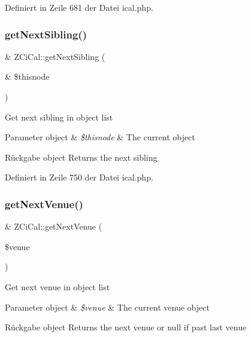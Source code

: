 Definiert in Zeile 681 der Datei ical.\+php.

\mbox{\label{class_z_ci_cal_a58f91909ccb0ce0cd0252427945b0049}} 
\subsubsection{\texorpdfstring{get\+Next\+Sibling()}{getNextSibling()}}
{\footnotesize\ttfamily \& Z\+Ci\+Cal\+::get\+Next\+Sibling (\begin{DoxyParamCaption}\item[{\&}]{\$thisnode }\end{DoxyParamCaption})}

Get next sibling in object list


\begin{DoxyParams}[1]{Parameter}
object & {\em \$thisnode} & The current object\\
\hline
\end{DoxyParams}
\begin{DoxyReturn}{Rückgabe}
object Returns the next sibling 
\end{DoxyReturn}


Definiert in Zeile 750 der Datei ical.\+php.

\mbox{\label{class_z_ci_cal_a39f53526421aa7122720bd5fae17b886}} 
\subsubsection{\texorpdfstring{get\+Next\+Venue()}{getNextVenue()}}
{\footnotesize\ttfamily \& Z\+Ci\+Cal\+::get\+Next\+Venue (\begin{DoxyParamCaption}\item[{}]{\$venue }\end{DoxyParamCaption})}

Get next venue in object list


\begin{DoxyParams}[1]{Parameter}
object & {\em \$venue} & The current venue object\\
\hline
\end{DoxyParams}
\begin{DoxyReturn}{Rückgabe}
object Returns the next venue or null if past last venue 
\end{DoxyReturn}


